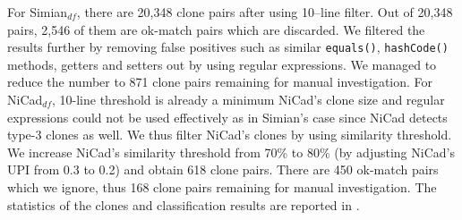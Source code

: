 \documentclass{sig-alternate-05-2015}
\begin{document}
For Simian$_{df}$, there are 20,348 clone pairs after using 10--line filter. Out of 20,348 pairs, 2,546 of them are ok-match pairs which are discarded. We filtered the results further by removing false positives such as similar \verb|equals()|, \verb|hashCode()| methods, getters and setters out by using regular expressions. We managed to reduce the number to 871 clone pairs remaining for manual investigation. 
For NiCad$_{df}$, 10-line threshold is already a minimum NiCad's clone size and regular expressions could not be used effectively as in Simian's case since NiCad detects type-3 clones as well. We thus filter NiCad's clones by using similarity threshold. We increase NiCad's similarity threshold from 70\% to 80\% (by adjusting NiCad's $\mathrm{UPI}$ from 0.3 to 0.2) and obtain 618 clone pairs. %
There are 450 ok-match pairs which we ignore, thus 168 clone pairs remaining for manual investigation. The statistics of the clones and classification results are reported in .

\end{document}
